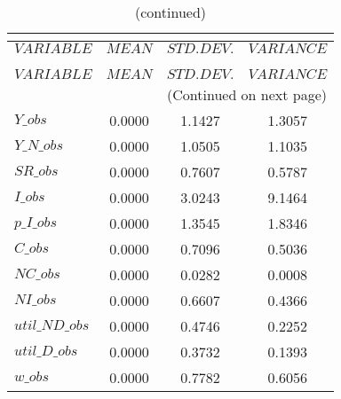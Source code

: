  
\begin{center}
\begin{longtable}{lccc} 
\caption{THEORETICAL MOMENTS}\\
 \label{Table:th_moments}\\
\toprule 
$VARIABLE       $	 & 	 $         MEAN$	 & 	 $    STD. DEV.$	 & 	 $     VARIANCE$\\
\midrule \endfirsthead 
\caption{(continued)}\\
 \toprule \\ 
$VARIABLE       $	 & 	 $         MEAN$	 & 	 $    STD. DEV.$	 & 	 $     VARIANCE$\\
\midrule \endhead 
\midrule \multicolumn{4}{r}{(Continued on next page)} \\ \bottomrule \endfoot 
\bottomrule \endlastfoot 
$Y\_obs         $	 & 	       0.0000	 & 	       1.1427	 & 	       1.3057 \\ 
$Y\_N\_obs      $	 & 	       0.0000	 & 	       1.0505	 & 	       1.1035 \\ 
$SR\_obs        $	 & 	       0.0000	 & 	       0.7607	 & 	       0.5787 \\ 
$I\_obs         $	 & 	       0.0000	 & 	       3.0243	 & 	       9.1464 \\ 
$p\_I\_obs      $	 & 	       0.0000	 & 	       1.3545	 & 	       1.8346 \\ 
$C\_obs         $	 & 	       0.0000	 & 	       0.7096	 & 	       0.5036 \\ 
$NC\_obs        $	 & 	       0.0000	 & 	       0.0282	 & 	       0.0008 \\ 
$NI\_obs        $	 & 	       0.0000	 & 	       0.6607	 & 	       0.4366 \\ 
$util\_ND\_obs  $	 & 	       0.0000	 & 	       0.4746	 & 	       0.2252 \\ 
$util\_D\_obs   $	 & 	       0.0000	 & 	       0.3732	 & 	       0.1393 \\ 
$w\_obs         $	 & 	       0.0000	 & 	       0.7782	 & 	       0.6056 \\ 
\end{longtable}
 \end{center}
